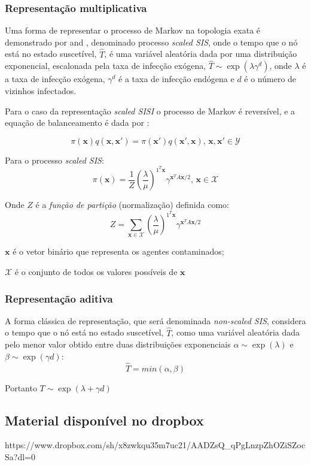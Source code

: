 \documentclass[a4paper]{article}
\begin{document}
\subsubsection{Representação multiplicativa}
Uma forma de representar o processo de Markov na topologia exata é demonstrado por \cite{zhang2015contact} and \cite{zhang2014diffusion}, denominado processo \textit{scaled SIS}, onde o tempo que o nó está no estado suscetível, $\hat{T}$, é uma variável aleatória dada por uma distribuição exponencial, escalonada pela taxa de infecção exógena, $\hat{T} \sim \exp(\lambda\gamma^{d})$, onde $\lambda$ é a taxa de infecção exógena, $\gamma^{d}$ é a taxa de infecção endógena e $d$ é o número de vizinhos infectados.

	Para o caso da representação \textit{scaled SISI} o processo de Markov é reversível, e a equação de balanceamento é dada por \cite{kelly1979reversibility}:
	
	\[
	 \pi(\boldsymbol{x}) q(\boldsymbol{x},\boldsymbol{x'}) = \pi(\boldsymbol{x'})q(\boldsymbol{x'},\boldsymbol{x}) \textrm{, } \boldsymbol{x},\boldsymbol{x'} \in \mathcal{Y}
	\]

	Para o processo \textit{scaled SIS}:
	\[
	 \pi(\boldsymbol{x}) = \frac{1}{Z} \left( \frac{\lambda}{\mu}\right)^{1^{T}\boldsymbol{x}} \gamma^{\boldsymbol{x}^{T}A\boldsymbol{x}/2} \textrm{, } \boldsymbol{x} \in \mathcal{X}
	 \label{eq:equilibriumScaledSIS}
	\]
	
	Onde $Z$ é a \textit{função de partição} (normalização) definida como:
	\[
	 Z = \sum_{\boldsymbol{x} \in \mathcal{X}} \left( \frac{\lambda}{\mu}\right)^{1^{T}\boldsymbol{x}} \gamma^{\boldsymbol{x}^{T}A\boldsymbol{x}/2}
	\]
    
    $\boldsymbol{x}$ é o vetor binário que representa os agentes contaminados;
    
    $\mathcal{X}$ é o conjunto de todos os valores possíveis de $\boldsymbol{x}$

\subsubsection{Representação aditiva}
        A forma clássica de representação, que será denominada \textit{non-scaled SIS}, considera o tempo que o nó está no estado suscetível, $\hat{T}$, como uma variável aleatória dada pelo menor valor obtido entre duas distribuições exponenciais $\alpha \sim \exp(\lambda) $ e $\beta \sim \exp(\gamma d)$:
        \[ \hat{T} = min(\alpha,\beta) \]
        
        Portanto $T \sim \exp(\lambda + \gamma d)$ 

\subsection{Material disponível no dropbox}
https://www.dropbox.com/sh/x8zwkqu35m7uc21/AADZsQ\_qPgLnzpZhOZiSZocSa?dl=0


\end{document}
